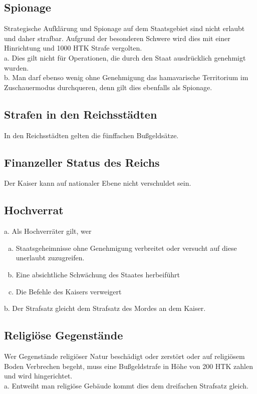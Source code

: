 \documentclass{article}
\begin{document}
\subsection{Spionage}
Strategische Aufklärung und Spionage auf dem Staatsgebiet sind nicht erlaubt und daher strafbar. Aufgrund der besonderen Schwere wird dies mit einer Hinrichtung und 1000 HTK Strafe vergolten.\\
a. Dies gilt nicht für Operationen, die durch den Staat ausdrücklich genehmigt wurden. \\
b. Man darf ebenso wenig ohne Genehmigung das hamavarische Territorium im Zuschauermodus durchqueren, denn gilt dies ebenfalls als Spionage.

\subsection{Strafen in den Reichsstädten}
In den Reichsstädten gelten die fünffachen Bußgeldsätze.

\subsection{Finanzeller Status des Reichs}
Der Kaiser kann auf nationaler Ebene nicht verschuldet sein.

\subsection{Hochverrat}
a.	Als Hochverräter gilt, wer
\begin{enumerate}[a)]
	\item Staatsgeheimnisse ohne Genehmigung verbreitet oder versucht auf diese unerlaubt zuzugreifen.
	\item Eine absichtliche Schwächung des Staates herbeiführt
	\item Die Befehle des Kaisers verweigert
\end{enumerate}
b.	Der Strafsatz gleicht dem Strafsatz des Mordes an dem Kaiser.

\subsection{Religiöse Gegenstände}
Wer Gegenstände religiöser Natur beschädigt oder zerstört oder auf religiösem Boden Verbrechen begeht, muss eine Bußgeldstrafe in Höhe von 200 HTK zahlen und wird hingerichtet.\\
a. Entweiht man religiöse Gebäude kommt dies dem dreifachen Strafsatz gleich.
\end{document}
